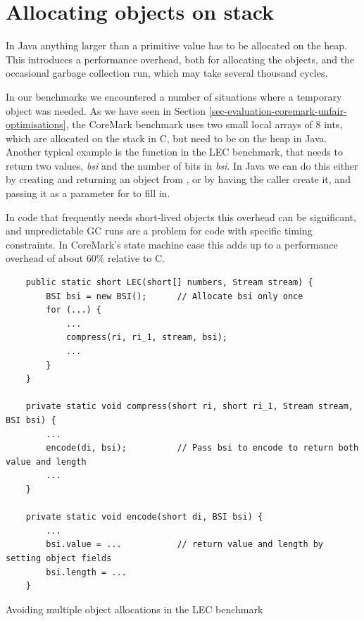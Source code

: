 \section{Allocating objects on stack}
\label{sec-no-gc}
In Java anything larger than a primitive value has to be allocated on the heap. This introduces a performance overhead, both for allocating the objects, and the occasional garbage collection run, which may take several thousand cycles.

In our benchmarks we encountered a number of situations where a temporary object was needed. As we have seen in Section \ref{sec-evaluation-coremark-unfair-optimisations}, the CoreMark benchmark uses two small local arrays of 8 ints, which are allocated on the stack in C, but need to be on the heap in Java. Another typical example is the  function in the LEC benchmark, that needs to return two values, \emph{bsi} and the number of bits in \emph{bsi}. In Java we can do this either by creating and returning an object from , or by having the caller create it, and passing it as a parameter for  to fill in.

In code that frequently needs short-lived objects this overhead can be significant, and unpredictable GC runs are a problem for code with specific timing constraints. In CoreMark's state machine case this adds up to a performance overhead of about 60\% relative to C.

\begin{listing}[H]
	\centering
	\begin{verbatim}
    public static short LEC(short[] numbers, Stream stream) {
        BSI bsi = new BSI();      // Allocate bsi only once
        for (...) {
            ...
            compress(ri, ri_1, stream, bsi);
            ...
        }
    }

    private static void compress(short ri, short ri_1, Stream stream, BSI bsi) {
        ...
        encode(di, bsi);          // Pass bsi to encode to return both value and length
        ...
    }

    private static void encode(short di, BSI bsi) {
        ...
        bsi.value = ...           // return value and length by setting object fields
        bsi.length = ...
    }
	\end{verbatim}
\caption{Avoiding multiple object allocations in the LEC benchmark}
\label{lst-lec-avoiding-object-allocations}
\end{listing}

